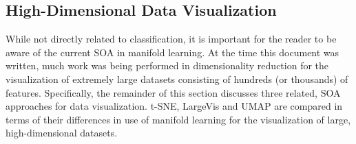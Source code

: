 \subsection{High-Dimensional Data Visualization} \label{sec:High_Dim_Data_Visualization}
While not directly related to classification, it is important for the reader to be aware of the current SOA in manifold learning.  At the time this document was written, much work was being performed in dimensionality reduction for the visualization of extremely large datasets consisting of hundreds (or thousands) of features.   Specifically, the remainder of this section discusses three related, SOA approaches for data visualization.  t-SNE, LargeVis and UMAP are compared in terms of their differences in use of manifold learning for the visualization of large, high-dimensional datasets.


